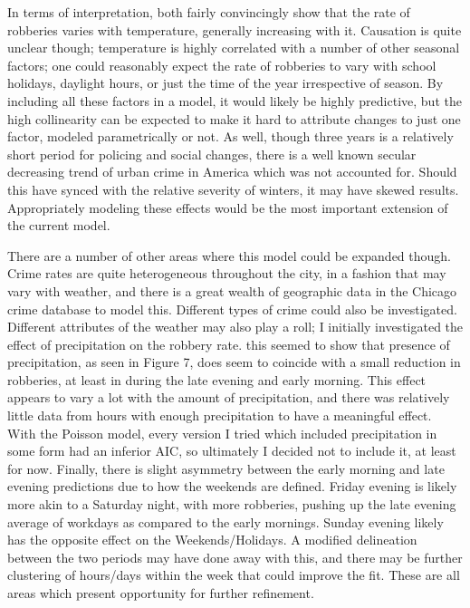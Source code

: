 \documentclass[11pt]{article}
\theoremstyle{definition}
\begin{document}
In terms of interpretation, both fairly convincingly show that the rate of robberies varies with temperature, generally increasing with it. Causation is quite unclear though; temperature is highly correlated with a number of other seasonal factors; one could reasonably expect the rate of robberies to vary with school holidays, daylight hours, or just the time of the year irrespective of season. By including all these factors in a model, it would likely be highly predictive, but the high collinearity can be expected to make it hard to attribute changes to just one factor, modeled parametrically or not. As well, though three years is a relatively short period for policing and social changes, there is a well known secular decreasing trend of urban crime in America which was not accounted for. Should this have synced with the relative severity of winters, it may have skewed results. Appropriately modeling these effects would be the most important extension of the current model. \par
There are a number of other areas where this model could be expanded though. Crime rates are quite heterogeneous throughout the city, in a fashion that may vary with weather, and there is a great wealth of geographic data in the Chicago crime database to model this. Different types of crime could also be investigated. Different attributes of the weather may also play a roll; I initially investigated the effect of precipitation on the robbery rate. this seemed to show that presence of precipitation, as seen in Figure 7, does seem to coincide with a small reduction in robberies, at least in during the late evening and early morning. This effect appears to vary a lot with the amount of precipitation, and there was relatively little data from hours with enough precipitation to have a meaningful effect. With the Poisson model, every version I tried which included precipitation in some form had an inferior AIC, so ultimately I decided not to include it, at least for now. Finally, there is slight asymmetry between the early morning and late evening predictions due to how the weekends are defined. Friday evening is likely more akin to a Saturday night, with more robberies, pushing up the late evening average of workdays as compared to the early mornings. Sunday evening likely has the opposite effect on the Weekends/Holidays. A modified delineation between the two periods may have done away with this, and there may be further clustering of hours/days within the week that could improve the fit. These are all areas which present opportunity for further refinement.
\end{document}
